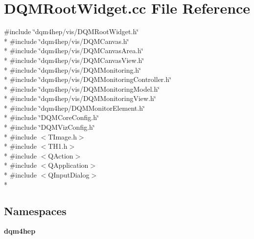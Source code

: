\section{D\+Q\+M\+Root\+Widget.\+cc File Reference}
\label{DQMRootWidget_8cc}
{\ttfamily \#include \char`\"{}dqm4hep/vis/\+D\+Q\+M\+Root\+Widget.\+h\char`\"{}}\\*
{\ttfamily \#include \char`\"{}dqm4hep/vis/\+D\+Q\+M\+Canvas.\+h\char`\"{}}\\*
{\ttfamily \#include \char`\"{}dqm4hep/vis/\+D\+Q\+M\+Canvas\+Area.\+h\char`\"{}}\\*
{\ttfamily \#include \char`\"{}dqm4hep/vis/\+D\+Q\+M\+Canvas\+View.\+h\char`\"{}}\\*
{\ttfamily \#include \char`\"{}dqm4hep/vis/\+D\+Q\+M\+Monitoring.\+h\char`\"{}}\\*
{\ttfamily \#include \char`\"{}dqm4hep/vis/\+D\+Q\+M\+Monitoring\+Controller.\+h\char`\"{}}\\*
{\ttfamily \#include \char`\"{}dqm4hep/vis/\+D\+Q\+M\+Monitoring\+Model.\+h\char`\"{}}\\*
{\ttfamily \#include \char`\"{}dqm4hep/vis/\+D\+Q\+M\+Monitoring\+View.\+h\char`\"{}}\\*
{\ttfamily \#include \char`\"{}dqm4hep/\+D\+Q\+M\+Monitor\+Element.\+h\char`\"{}}\\*
{\ttfamily \#include \char`\"{}D\+Q\+M\+Core\+Config.\+h\char`\"{}}\\*
{\ttfamily \#include \char`\"{}D\+Q\+M\+Viz\+Config.\+h\char`\"{}}\\*
{\ttfamily \#include $<$T\+Image.\+h$>$}\\*
{\ttfamily \#include $<$T\+H1.\+h$>$}\\*
{\ttfamily \#include $<$Q\+Action$>$}\\*
{\ttfamily \#include $<$Q\+Application$>$}\\*
{\ttfamily \#include $<$Q\+Input\+Dialog$>$}\\*
\subsection*{Namespaces}
\begin{DoxyCompactItemize}
\item 
 {\bf dqm4hep}
\end{DoxyCompactItemize}
